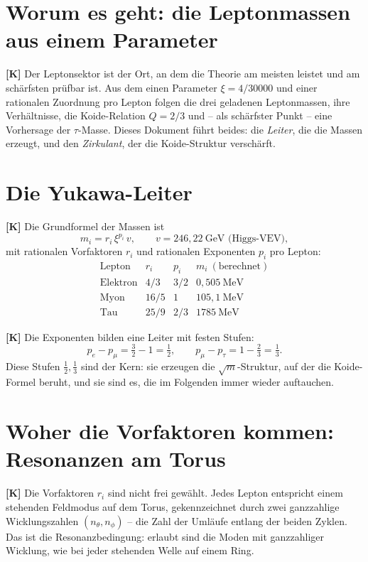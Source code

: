 \section{Worum es geht: die Leptonmassen aus einem Parameter}

\textbf{[K]} Der Leptonsektor ist der Ort, an dem die Theorie am meisten leistet
und am schärfsten prüfbar ist. Aus dem einen Parameter $\xi = 4/30000$ und einer
rationalen Zuordnung pro Lepton folgen die drei geladenen Leptonmassen, ihre
Verhältnisse, die Koide-Relation $Q=2/3$ und -- als schärfster Punkt -- eine
Vorhersage der $\tau$-Masse. Dieses Dokument führt beides: die \emph{Leiter}, die
die Massen erzeugt, und den \emph{Zirkulant}, der die Koide-Struktur verschärft.

\section{Die Yukawa-Leiter}

\textbf{[K]} Die Grundformel der Massen ist
\[
  m_i = r_i\,\xi^{p_i}\,v, \qquad v = 246{,}22\ \text{GeV (Higgs-VEV)},
\]
mit rationalen Vorfaktoren $r_i$ und rationalen Exponenten $p_i$ pro Lepton:
\[
  \begin{array}{lccc}
    \text{Lepton} & r_i & p_i & m_i\ (\text{berechnet}) \\[2pt]
    \text{Elektron} & 4/3 & 3/2 & 0{,}505\ \text{MeV} \\
    \text{Myon}     & 16/5 & 1  & 105{,}1\ \text{MeV} \\
    \text{Tau}      & 25/9 & 2/3 & 1785\ \text{MeV}
  \end{array}
\]

\textbf{[K]} Die Exponenten bilden eine Leiter mit festen Stufen:
\[
  p_e - p_\mu = \tfrac32 - 1 = \tfrac12, \qquad
  p_\mu - p_\tau = 1 - \tfrac23 = \tfrac13.
\]
Diese Stufen $\tfrac12, \tfrac13$ sind der Kern: sie erzeugen die
$\sqrt{m}$-Struktur, auf der die Koide-Formel beruht, und sie sind es, die im
Folgenden immer wieder auftauchen.

\section{Woher die Vorfaktoren kommen: Resonanzen am Torus}

\textbf{[K]} Die Vorfaktoren $r_i$ sind nicht frei gewählt. Jedes Lepton
entspricht einem stehenden Feldmodus auf dem Torus, gekennzeichnet durch zwei
ganzzahlige Wicklungszahlen $(n_\theta, n_\phi)$ -- die Zahl der Umläufe entlang
der beiden Zyklen. Das ist die Resonanzbedingung: erlaubt sind die Moden mit
ganzzahliger Wicklung, wie bei jeder stehenden Welle auf einem Ring.

